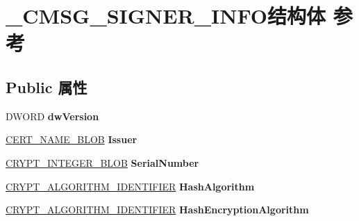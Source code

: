 \hypertarget{struct___c_m_s_g___s_i_g_n_e_r___i_n_f_o}{}\section{\+\_\+\+C\+M\+S\+G\+\_\+\+S\+I\+G\+N\+E\+R\+\_\+\+I\+N\+F\+O结构体 参考}
\label{struct___c_m_s_g___s_i_g_n_e_r___i_n_f_o}
\subsection*{Public 属性}
\begin{DoxyCompactItemize}
\item 
\mbox{\label{struct___c_m_s_g___s_i_g_n_e_r___i_n_f_o_adeb3d83b168d46f62bed92ec595f7fac}} 
D\+W\+O\+RD {\bfseries dw\+Version}
\item 
\mbox{\label{struct___c_m_s_g___s_i_g_n_e_r___i_n_f_o_a4ed5112322dd458878912804e1f9605e}} 
\hyperlink{struct___c_r_y_p_t_o_a_p_i___b_l_o_b}{C\+E\+R\+T\+\_\+\+N\+A\+M\+E\+\_\+\+B\+L\+OB} {\bfseries Issuer}
\item 
\mbox{\label{struct___c_m_s_g___s_i_g_n_e_r___i_n_f_o_a5a23ec340cc22082baf53d11630ab424}} 
\hyperlink{struct___c_r_y_p_t_o_a_p_i___b_l_o_b}{C\+R\+Y\+P\+T\+\_\+\+I\+N\+T\+E\+G\+E\+R\+\_\+\+B\+L\+OB} {\bfseries Serial\+Number}
\item 
\mbox{\label{struct___c_m_s_g___s_i_g_n_e_r___i_n_f_o_ac28e28c1ad033a2db8189b953eff21d7}} 
\hyperlink{struct___c_r_y_p_t___a_l_g_o_r_i_t_h_m___i_d_e_n_t_i_f_i_e_r}{C\+R\+Y\+P\+T\+\_\+\+A\+L\+G\+O\+R\+I\+T\+H\+M\+\_\+\+I\+D\+E\+N\+T\+I\+F\+I\+ER} {\bfseries Hash\+Algorithm}
\item 
\mbox{\label{struct___c_m_s_g___s_i_g_n_e_r___i_n_f_o_a64724a60609f1a33389b4fc3f05eb03c}} 
\hyperlink{struct___c_r_y_p_t___a_l_g_o_r_i_t_h_m___i_d_e_n_t_i_f_i_e_r}{C\+R\+Y\+P\+T\+\_\+\+A\+L\+G\+O\+R\+I\+T\+H\+M\+\_\+\+I\+D\+E\+N\+T\+I\+F\+I\+ER} {\bfseries Hash\+Encryption\+Algorithm}
\item 
\mbox{\label{struct___c_m_s_g___s_i_g_n_e_r___i_n_f_o_a7645e4441f6c4e5bd536a67277e51699}} 

\end{DoxyCompactItemize}

